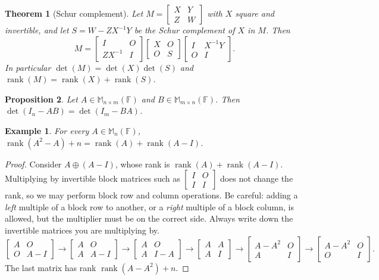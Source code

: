 \documentclass[12pt]{article}
\DeclareMathOperator{\Rank}{rank}
\theoremstyle{breakplain}
\newtheorem{theorem}{Theorem}[section]
\newtheorem{prop}[theorem]{Proposition}
\theoremstyle{breakdef}
\newtheorem*{example}{Example}
\theoremstyle{remark}
\begin{document}
\begin{theorem}[Schur complement]
    Let $M=\begin{bmatrix}
        X & Y \\
        Z & W
    \end{bmatrix}$ with $X$ square and invertible, and let $S=W-ZX^{-1}Y$ be the \emph{Schur complement} of $X$ in $M$. Then
    \[M=\begin{bmatrix}
        I & O\\
        ZX^{-1} & I
    \end{bmatrix}\begin{bmatrix}
        X & O\\
        O & S
    \end{bmatrix}\begin{bmatrix}
        I & X^{-1}Y\\
        O & I
    \end{bmatrix}.\]
    In particular $\det(M)=\det(X)\det(S)$ and $\Rank(M)=\Rank(X)+\Rank(S)$.
\end{theorem}
\begin{prop}
    Let $A \in \mathbb{M}_{n \times m}(\mathbb{F})$ and $B \in \mathbb{M}_{m \times n}(\mathbb{F})$. Then $\det(I_n -AB)=\det(I_m-BA)$.
\end{prop}
\begin{example}
    For every $A\in\mathbb{M}_n(\mathbb{F})$, $\Rank(A^2-A)+n=\Rank(A)+\Rank(A-I)$.
\end{example}
\begin{proof}
    Consider $A\oplus (A-I)$, whose rank is $\Rank(A)+\Rank(A-I)$. Multiplying by invertible block matrices such as $\begin{bmatrix} I & O\\
        I & I
    \end{bmatrix}$ does not change the rank, so we may perform block row and column operations. Be careful: adding a \emph{left} multiple of a block row to another, or a \emph{right} multiple of a block column, is allowed, but the multiplier must be on the correct side. Always write down the invertible matrices you are multiplying by.
    \[\begin{bmatrix}
    A & O\\
    O & A-I
    \end{bmatrix}\to
    \begin{bmatrix}
    A & O\\
    A & A-I
    \end{bmatrix}\to
    \begin{bmatrix}
    A & O\\
    A & I-A
    \end{bmatrix}\to
    \begin{bmatrix}
    A & A\\
    A & I
    \end{bmatrix}\to
    \begin{bmatrix}
    A-A^2 & O\\
    A & I
    \end{bmatrix}\to
    \begin{bmatrix}
    A-A^2 & O\\
    O & I
    \end{bmatrix}.\]
    The last matrix has rank $\Rank(A-A^2)+n$.
\end{proof}
\end{document}

